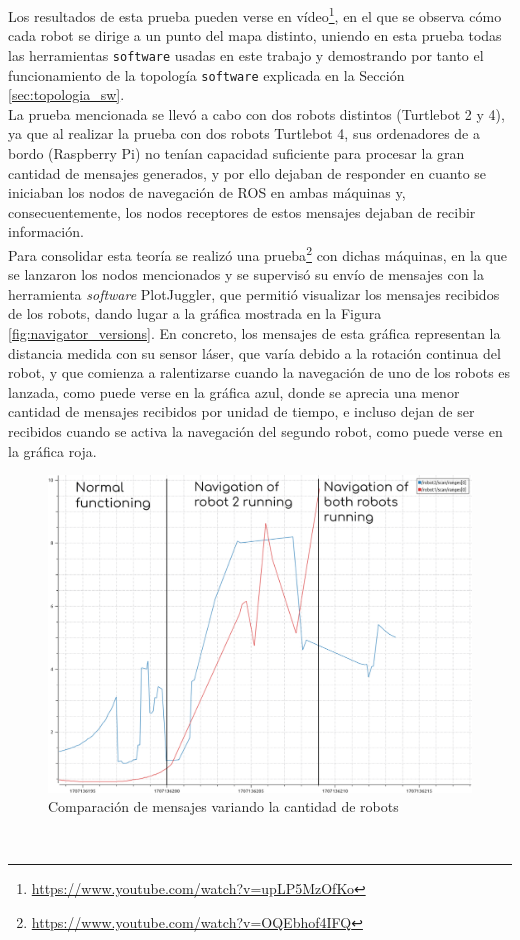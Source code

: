 Los resultados de esta prueba pueden verse en vídeo\footnote{
\href{https://www.youtube.com/watch?v=upLP5MzOfKo}{https://www.youtube.com/watch?v=upLP5MzOfKo}},
en el que se observa cómo cada robot se dirige a un punto del mapa distinto,
uniendo en esta prueba todas las herramientas \texttt{software} usadas en este
trabajo y demostrando por tanto el funcionamiento de la topología
\texttt{software} explicada en la Sección \ref{sec:topologia_sw}.
\\

La prueba mencionada se llevó a cabo con dos robots distintos (Turtlebot 2 y 4),
ya que al realizar la prueba con dos robots Turtlebot 4, sus ordenadores de a
bordo (Raspberry Pi) no tenían capacidad suficiente para procesar la gran
cantidad de mensajes generados, y por ello dejaban de responder en cuanto se
iniciaban los nodos de navegación de ROS en ambas máquinas y, consecuentemente,
los nodos receptores de estos mensajes dejaban de recibir información.
\\

Para consolidar esta teoría se realizó una prueba\footnote{
\href{https://www.youtube.com/watch?v=OQEbhof4IFQ}{https://www.youtube.com/watch?v=OQEbhof4IFQ}}
con dichas máquinas, en la que se lanzaron los nodos mencionados y se supervisó
su envío de mensajes con la herramienta \textit{software} PlotJuggler, que
permitió visualizar los mensajes recibidos de los robots, dando lugar a la
gráfica mostrada en la Figura \ref{fig:navigator_versions}.
En concreto, los mensajes de esta gráfica representan la distancia medida con su
sensor láser, que varía debido a la rotación continua del robot, y que comienza
a ralentizarse cuando la navegación de uno de los robots es lanzada, como puede
verse en la gráfica azul, donde se aprecia una menor cantidad de mensajes
recibidos por unidad de tiempo, e incluso dejan de ser recibidos cuando se
activa la navegación del segundo robot, como puede verse en la gráfica roja.
\\

\begin{figure} [h!]
  \begin{center}
    \includegraphics[width=12cm]{figs/plot_congestion_explained}
  \end{center}
  \caption{Comparación de mensajes variando la cantidad de robots}
  \label{fig:plot_congestion}
\end{figure}\


